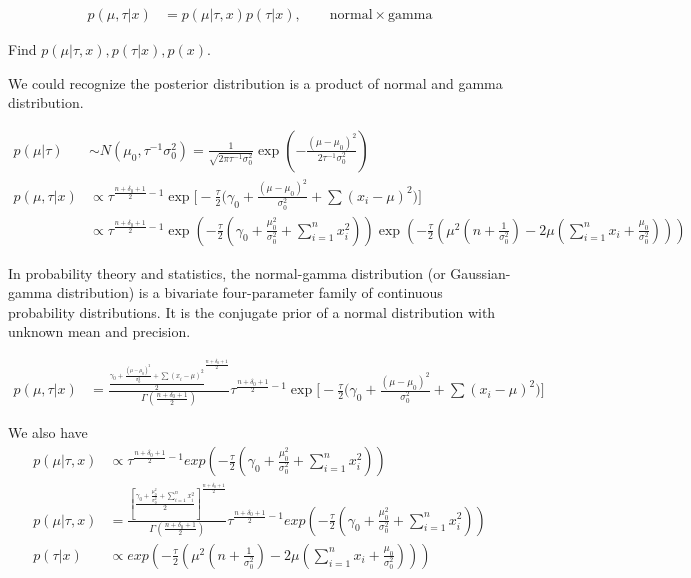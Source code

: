 \begin{align*}
	p(\mu, \tau|x)&= p(\mu| \tau, x) p(\tau|x), \qquad \text{normal} \times \text{gamma} 
\end{align*}	

Find $p(\mu | \tau, x), p(\tau | x), p(x)$. 

We could recognize the posterior distribution is a product of normal and gamma distribution. 

\begin{align*}
	p(\mu |\tau) & \sim N(\mu_0, \tau^{-1} \sigma_0^2) = \frac{1}{\sqrt{2\pi \tau^{-1} \sigma_0^2} } \exp(-\frac{(\mu-\mu_0)^2}{2 \tau^{-1} \sigma_0^2})\\
	p(\mu, \tau | x) & \propto \tau^{\frac{n + \delta_0 +1}{2} -1} \exp \Big[ -\frac{\tau}{2} \Big( \gamma_0 + \frac{ (\mu-\mu_0)^2}{\sigma_0^2} + \sum (x_i-\mu)^2 \Big) \Big]\\
	& \propto \tau^{\frac{n + \delta_0 +1}{2} -1} \exp(-\frac{\tau}{2} (\gamma_0 + \frac{\mu_0^2}{\sigma_0^2} + \sum_{i=1}^n x_i^2)) \exp(-\frac{\tau}{2} (\mu^2(n+\frac{1}{\sigma_0^2}) -2\mu(\sum_{i=1}^n x_i + \frac{\mu_0}{\sigma_0^2}))) 
\end{align*}	

In probability theory and statistics, the normal-gamma distribution (or Gaussian-gamma distribution) is a bivariate four-parameter family of continuous probability distributions. It is the conjugate prior of a normal distribution with unknown mean and precision.

\begin{align*}
	p(\mu ,\tau |x) & = \frac{\frac{ \gamma_0 + \frac{ (\mu-\mu_0)^2}{\sigma_0^2} + \sum (x_i-\mu)^2  }{2} ^{\frac{n + \delta_0 +1}{2} }}{\Gamma(\frac{n + \delta_0 +1}{2} )} \tau^{\frac{n + \delta_0 +1}{2} -1} \exp \Big[ -\frac{\tau}{2} \Big( \gamma_0 + \frac{ (\mu-\mu_0)^2}{\sigma_0^2} + \sum (x_i-\mu)^2 \Big) \Big]
\end{align*}

We also have 
\begin{align*}
	p(\mu| \tau,x)& \propto \tau^{\frac{n + \delta_0 +1}{2} -1} exp(-\frac{\tau}{2} (\gamma_0 + \frac{\mu_0^2}{\sigma_0^2} + \sum_{i=1}^n x_i^2)) \\
	p(\mu| \tau,x)& = \frac{[\frac{\gamma_0 + \frac{\mu_0^2}{\sigma_0^2} + \sum_{i=1}^n x_i^2}{2}]^{\frac{n + \delta_0 +1}{2}}}{\Gamma(\frac{n + \delta_0 +1}{2})} \tau^{\frac{n + \delta_0 +1}{2} -1} exp(-\frac{\tau}{2} (\gamma_0 + \frac{\mu_0^2}{\sigma_0^2} + \sum_{i=1}^n x_i^2)) \\
	p(\tau | x)& \propto  exp(-\frac{\tau}{2} (\mu^2(n+\frac{1}{\sigma_0^2}) -2\mu(\sum_{i=1}^n x_i + \frac{\mu_0}{\sigma_0^2}))) 
\end{align*}	

